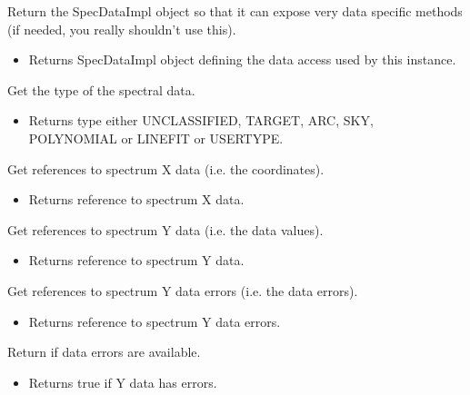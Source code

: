 \begin{desc}Return the SpecDataImpl object so that it can expose very data
 specific methods (if needed, you really shouldn't use this).
\begin{itemize}
\item{Returns SpecDataImpl object defining the data access used by
         this instance. }
\end{itemize}
\end{desc}

\begin{desc}Get the type of the spectral data.
\begin{itemize}
\item{Returns type either UNCLASSIFIED, TARGET, ARC, SKY, POLYNOMIAL or
                     LINEFIT or USERTYPE. }
\end{itemize}
\end{desc}

\begin{desc}Get references to spectrum X data (i.e. the coordinates).
\begin{itemize}
\item{Returns reference to spectrum X data. }
\end{itemize}
\end{desc}

\begin{desc}Get references to spectrum Y data (i.e. the data values).
\begin{itemize}
\item{Returns reference to spectrum Y data. }
\end{itemize}
\end{desc}

\begin{desc}Get references to spectrum Y data errors (i.e. the data
 errors).
\begin{itemize}
\item{Returns reference to spectrum Y data errors. }
\end{itemize}
\end{desc}

\begin{desc}Return if data errors are available.
\begin{itemize}
\item{Returns true if Y data has errors. }
\end{itemize}
\end{desc}

